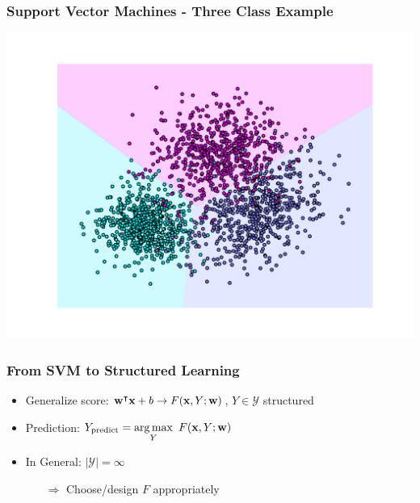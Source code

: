 \begin{frame}
    \frametitle{Support Vector Machines - Three Class Example}
    \includegraphics[width=\textwidth]{images/three_class_svm.pdf}
\end{frame}

\begin{frame}
    \frametitle{From SVM to Structured Learning}
    \begin{itemize}
          \item Generalize score: $\textbf{w}^{\intercal}\textbf{x} + b \rightarrow F(\textbf{x}, Y; \textbf{w})$, $Y \in
        \mathcal{Y}$ structured
          \item Prediction: $\displaystyle Y_{\text{predict}} = \operatorname*{arg\,max}_Y\ F(\textbf{x}, Y; \textbf{w}) $%
          \item In General: $|\mathcal{Y}| = \infty$
        \begin{itemize}
              \item[$\Rightarrow$] Choose/design $F$ appropriately
        \end{itemize}
          \item[] \cf {}
    \end{itemize}
\end{frame}


